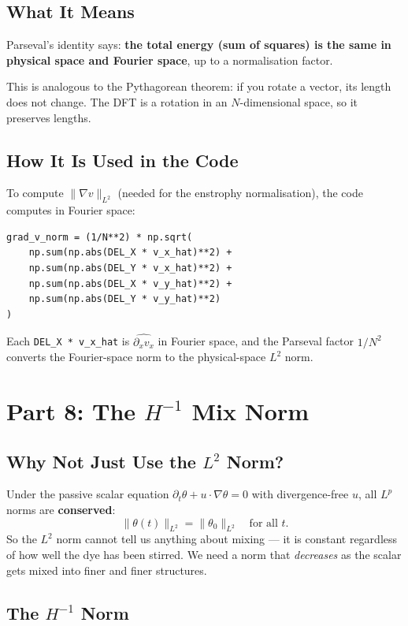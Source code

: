 \documentclass[12pt,a4paper]{article}
\newcommand{\code}[1]{\texttt{#1}}
\theoremstyle{definition}
\begin{document}
\subsection{What It Means}

Parseval's identity says: \textbf{the total energy (sum of squares) is the
same in physical space and Fourier space}, up to a normalisation factor.

This is analogous to the Pythagorean theorem: if you rotate a vector, its
length does not change.  The DFT is a rotation in an $N$-dimensional space, so
it preserves lengths.

\subsection{How It Is Used in the Code}

To compute $\|\nabla v\|_{L^2}$ (needed for the enstrophy normalisation), the
code computes in Fourier space:
\begin{lstlisting}
grad_v_norm = (1/N**2) * np.sqrt(
    np.sum(np.abs(DEL_X * v_x_hat)**2) +
    np.sum(np.abs(DEL_Y * v_x_hat)**2) +
    np.sum(np.abs(DEL_X * v_y_hat)**2) +
    np.sum(np.abs(DEL_Y * v_y_hat)**2)
)
\end{lstlisting}
Each \code{DEL\_X * v\_x\_hat} is $\widehat{\partial_x v_x}$ in Fourier space,
and the Parseval factor $1/N^2$ converts the Fourier-space norm to the
physical-space $L^2$ norm.

\section{Part 8: The \texorpdfstring{$H^{-1}$}{H\^{}\{-1\}} Mix Norm}

\subsection{Why Not Just Use the $L^2$ Norm?}

Under the passive scalar equation $\partial_t\theta + u\cdot\nabla\theta = 0$
with divergence-free $u$, all $L^p$ norms are \textbf{conserved}:
\[
  \|\theta(t)\|_{L^2} = \|\theta_0\|_{L^2} \quad \text{for all } t.
\]
So the $L^2$ norm cannot tell us anything about mixing — it is constant
regardless of how well the dye has been stirred.  We need a norm that
\emph{decreases} as the scalar gets mixed into finer and finer structures.

\subsection{The $H^{-1}$ Norm}
\end{document}
